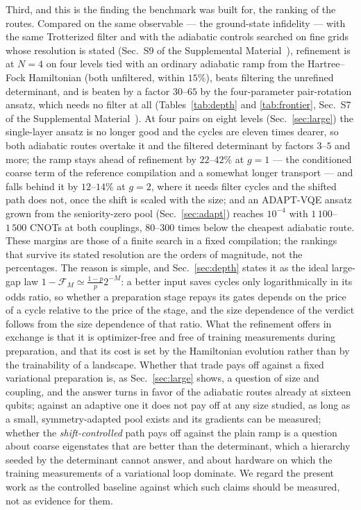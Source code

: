 \documentclass[
  aps,            %
  prc,            %
  reprint,        %
  superscriptaddress,
  floatfix,
  nofootinbib
]{revtex4-2}
\newcommand{\SM}{Supplemental Material~\cite{SM}}
\begin{document}
Third, and this is the finding the benchmark was built for, the ranking of
the routes.  Compared on the same observable --- the ground-state
infidelity --- with the same Trotterized filter and with the adiabatic
controls searched on fine grids whose resolution is stated
(Sec.~S9 of the \SM{}), refinement is at $N=4$ on four levels tied with
an ordinary adiabatic ramp from the Hartree--Fock Hamiltonian (both
unfiltered, within $15\%$), beats filtering the unrefined
determinant, and is beaten by a factor $30$--$65$ by the
four-parameter pair-rotation ansatz, which needs no filter at all
(Tables~\ref{tab:depth} and \ref{tab:frontier}, Sec.~S7 of the \SM{}).  At
four pairs on eight levels (Sec.~\ref{sec:large}) the single-layer ansatz
is no longer good and the cycles are eleven times dearer, so both
adiabatic routes overtake it and the filtered determinant by factors
$3$--$5$ and more; the ramp stays ahead of refinement by $22$--$42\%$ at
$g=1$ --- the conditioned coarse term of the reference compilation and a
somewhat longer transport --- and falls behind it by $12$--$14\%$ at
$g=2$, where it needs filter cycles and the shifted path does not, once
the shift is scaled with the size; and an ADAPT-VQE ansatz grown from the
seniority-zero pool (Sec.~\ref{sec:adapt}) reaches $10^{-4}$ with
$1\,100$--$1\,500$ CNOTs at both couplings, $80$--$300$ times below the
cheapest adiabatic route.  These margins are those of a finite search in
a fixed compilation; the rankings that survive its stated resolution are
the orders of magnitude, not the percentages.  The reason is simple, and
Sec.~\ref{sec:depth} states it as the ideal large-gap law
$1-\mathcal F_M\simeq\tfrac{1-p}{p}2^{-M}$: a better input saves cycles only
logarithmically in its odds ratio, so whether a preparation stage repays its
gates depends on the price of a cycle relative to the price of the stage,
and the size dependence of the verdict follows from the size dependence of
that ratio.  What the refinement offers in exchange is that it is
optimizer-free and free of training measurements during preparation, and that its cost is
set by the Hamiltonian evolution rather than by the trainability of a
landscape.  Whether that trade pays off against a fixed variational preparation
is, as Sec.~\ref{sec:large} shows, a question of size and coupling, and the
answer turns in favor of the adiabatic routes already at sixteen qubits;
against an adaptive one it does not pay off at any size studied, as long as
a small, symmetry-adapted pool exists and its gradients can be measured;
whether the \emph{shift-controlled} path pays off against the plain ramp is
a question about coarse eigenstates that are better than the determinant,
which a hierarchy seeded by the determinant cannot answer, and about
hardware on which the training measurements of a variational loop
dominate.  We regard the present work as the controlled baseline against
which such claims should be measured, not as evidence for them.
\end{document}
